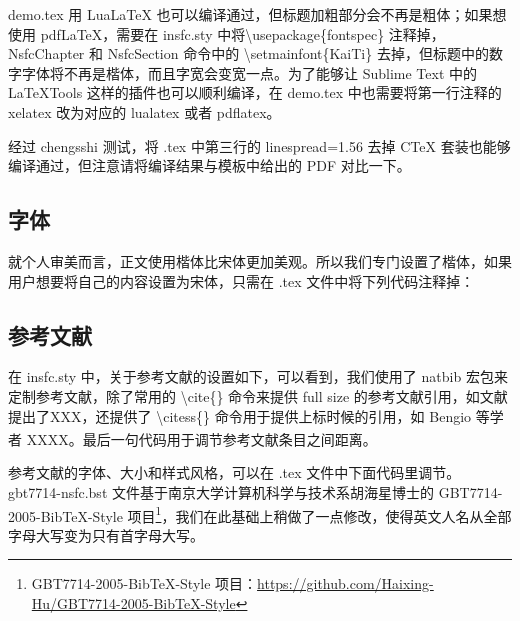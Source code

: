 \documentclass[a4paper,cs4size]{article}
\newcommand{\citess}[1]{\textsuperscript{\cite{#1}}}
\begin{document}
demo.tex 用 LuaLaTeX 也可以编译通过，但标题加粗部分会不再是粗体；如果想使用 pdfLaTeX，需要在 insfc.sty 中将\textbackslash usepackage\{fontspec\} 注释掉，NsfcChapter 和 NsfcSection 命令中的 \textbackslash setmainfont\{KaiTi\} 去掉，但标题中的数字字体将不再是楷体，而且字宽会变宽一点。为了能够让 Sublime Text 中的 LaTeXTools 这样的插件也可以顺利编译，在 demo.tex 中也需要将第一行注释的 xelatex 改为对应的 lualatex 或者 pdflatex。

经过 chengsshi 测试，将 .tex 中第三行的 linespread=1.56 去掉 CTeX 套装也能够编译通过，但注意请将编译结果与模板中给出的 PDF 对比一下。

\subsection{字体}
就个人审美而言，正文使用楷体比宋体更加美观。所以我们专门设置了楷体，如果用户想要将自己的内容设置为宋体，只需在 .tex 文件中将下列代码注释掉：


\subsection{参考文献}
在 insfc.sty 中，关于参考文献的设置如下，可以看到，我们使用了 natbib 宏包来定制参考文献，除了常用的 \textbackslash cite\{\} 命令来提供 full size 的参考文献引用，如文献\cite{li2014object}提出了XXX，还提供了 \textbackslash citess\{\} 命令用于提供上标时候的引用，如 Bengio 等学者\citess{bengio2013representation} XXXX。最后一句代码用于调节参考文献条目之间距离。


参考文献的字体、大小和样式风格，可以在 .tex 文件中下面代码里调节。gbt7714-nsfc.bst 文件基于南京大学计算机科学与技术系胡海星博士的 GBT7714-2005-BibTeX-Style 项目\footnote{GBT7714-2005-BibTeX-Style 项目：\href{https://github.com/Haixing-Hu/GBT7714-2005-BibTeX-Style}{https://github.com/Haixing-Hu/GBT7714-2005-BibTeX-Style}}，我们在此基础上稍做了一点修改，使得英文人名从全部字母大写变为只有首字母大写。
\end{document}
